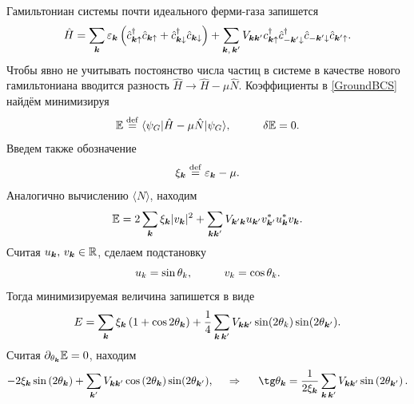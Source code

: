Гамильтониан системы почти идеального ферми-газа запишется \cite{ll9}
\begin{equation*}
	\hat{H} = \sum_{{\boldsymbol{k}}} \varepsilon_{{\boldsymbol{k}}} \left(
		\hat{c}^{\dag}_{{\boldsymbol{k}} \uparrow} \hat{c}_{{\boldsymbol{k}} \uparrow} + \hat{c}^{\dag}_{{\boldsymbol{k}} \downarrow} \hat{c}_{{\boldsymbol{k}} \downarrow}
	\right) + \sum_{{\boldsymbol{k}},\, {\boldsymbol{k}}'} V_{{\boldsymbol{k}} {\boldsymbol{k}}'} c^{\dag}_{{\boldsymbol{k}} \uparrow} \hat{c}^{\dag}_{-{\boldsymbol{k}}' \downarrow} \hat{c}_{-{\boldsymbol{k}}' \downarrow} \hat{c}_{{\boldsymbol{k}}' \uparrow}.
\end{equation*}
Чтобы явно не учитывать постоянство числа частиц в системе \cite{ll9} в качестве нового гамильтониана вводится разность $\hat{H} \to \hat{H} - \mu \hat{N}$. Коэффициенты в \eqref{GroundBCS} найдём минимизируя 
\begin{equation*}
	\mathbb{E} \overset{\mathrm{def}}{=}  \bk{\psi_G}[\hat{H} - \mu \hat{N}]{\psi_G},
	\hspace{10 mm} 
	\delta \mathbb{E} = 0.
\end{equation*}
Введем также обозначение
\begin{equation*}
	\xi_{{\boldsymbol{k}}} \overset{\mathrm{def}}{=} \varepsilon_{{\boldsymbol{k}}} - \mu.
\end{equation*}
Аналогично вычислению $\langle N\rangle$, находим 
\begin{equation*}
	\mathbb{E} = 2 \sum_{{\boldsymbol{k}}} \xi_{{\boldsymbol{k}}} |v_{{\boldsymbol{k}}}|^2 + \sum_{{\boldsymbol{k}} {\boldsymbol{k}}'} V_{{\boldsymbol{k}}' {\boldsymbol{k}}} u_{{\boldsymbol{k}}'} v_{{\boldsymbol{k}}'}^* u_{{\boldsymbol{k}}}^* v_{{\boldsymbol{k}}}.
\end{equation*}
Считая $u_{{\boldsymbol{k}}},\, v_{{\boldsymbol{k}}} \in \mathbb{R}$, сделаем подстановку
\begin{equation*}
	u_k = \sin \theta_k,
	\hspace{10 mm} 
	v_k = \cos \theta_k.
\end{equation*}
Тогда минимизируемая величина запишется в виде
\begin{equation*}
	E = \sum_{{\boldsymbol{k}}} \xi_{{\boldsymbol{k}}} \left(1 + \cos 2 \theta_{{\boldsymbol{k}}}\right) + 
	\frac{1}{4} \sum_{{\boldsymbol{k}}\, {\boldsymbol{k}}'} V_{{\boldsymbol{k}} {\boldsymbol{k}}'}\sin(2 \theta_k) \sin(2 \theta_{{\boldsymbol{k}}'}).
\end{equation*}
Считая $\partial_{\theta_{{\boldsymbol{k}}}} \mathbb{E} =0$,  находим
\begin{equation*}
	- 2 \xi_{\vc{k}} \sin\left(2 \theta_{\vc{k}}\right) + \sum_{\vc{k}'} V_{\vc{k} \vc{k}'} \cos\left(2 \theta_{\vc{k}}\right) \sin(2 \theta_{\vc{k}'}),
	\hspace{0.5cm} \Rightarrow \hspace{0.5cm}
	\tg \theta_{\vc{k}} = \frac{1}{2 \xi_{\vc{k}}} \sum_{\vc{k}\, \vc{k}'} V_{\vc{k} \vc{k}'} \sin\left(2 \theta_{\vc{k}'}\right).
\end{equation*}
